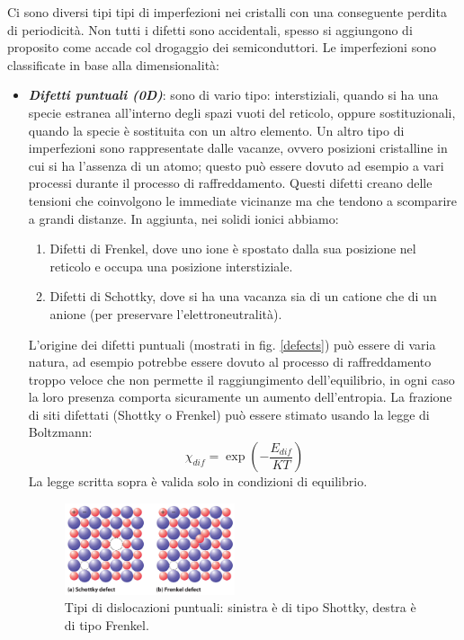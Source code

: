 Ci sono diversi tipi tipi di imperfezioni nei cristalli con una conseguente perdita di periodicità. Non tutti i difetti sono accidentali, spesso si aggiungono di proposito come accade col drogaggio dei semiconduttori.
Le imperfezioni sono classificate in base alla dimensionalità:
\begin{itemize}
    \item \textbf{\textit{Difetti puntuali (0D)}}: sono di vario tipo: interstiziali, quando si ha una specie estranea all'interno degli spazi vuoti del reticolo, oppure sostituzionali, quando la specie è sostituita con un altro elemento. 
    Un altro tipo di imperfezioni sono rappresentate dalle vacanze, ovvero posizioni cristalline in cui si ha l'assenza di un atomo; questo può essere dovuto ad esempio a vari processi durante il processo di raffreddamento. 
    Questi difetti creano delle tensioni che coinvolgono le immediate vicinanze ma che tendono a scomparire a grandi distanze.
    In aggiunta, nei solidi ionici abbiamo:
    \begin{enumerate}
        \item Difetti di Frenkel, dove uno ione è spostato dalla sua posizione nel reticolo e occupa una posizione interstiziale.
        \item Difetti di Schottky, dove si ha una vacanza sia di un catione che di un anione (per preservare l'elettroneutralità).
    \end{enumerate}
    L'origine dei difetti puntuali (mostrati in fig. \ref{defects}) può essere di varia natura, ad esempio potrebbe essere dovuto al processo di raffreddamento troppo veloce che non permette il raggiungimento dell'equilibrio, in ogni caso la loro presenza comporta sicuramente un aumento dell'entropia. La frazione di siti difettati (Shottky o Frenkel) può essere stimato usando la legge di Boltzmann:
    \begin{equation}
        \chi_{dif}=\exp\left(-\frac{E_{dif}}{KT}\right)
    \end{equation}
    La legge scritta sopra è valida solo in condizioni di equilibrio.
    \begin{figure}[h]
        \centering
        \includegraphics[width=5cm]{struttura/shottky.jpg}
        \caption{Tipi di dislocazioni puntuali: sinistra è di tipo Shottky, destra è di tipo Frenkel.}

\end{figure}
\end{itemize}
